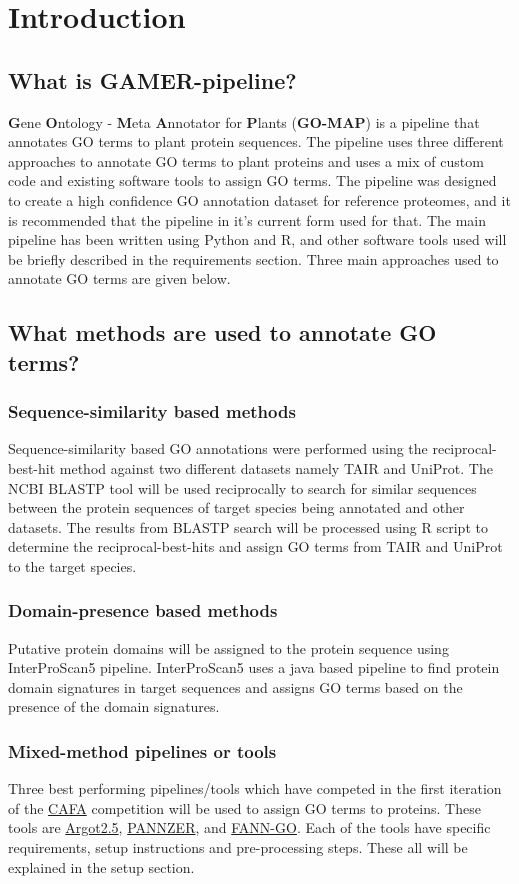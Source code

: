 \section{Introduction}

\subsection{What is GAMER-pipeline?}
\textbf{G}ene \textbf{O}ntology - \textbf{M}eta \textbf{A}nnotator for \textbf{P}lants (\textbf{GO-MAP}) is a pipeline that annotates GO terms to plant protein sequences. The pipeline uses three different approaches to annotate GO terms to plant proteins and uses a mix of custom code and existing software tools to assign GO terms. The pipeline was designed to create a high confidence GO annotation dataset for reference proteomes, and it is recommended that the pipeline in it's current form used for that. The main pipeline has been written using Python and R, and other software tools used will be briefly described in the requirements section. Three main approaches used to annotate GO terms are given below.

\subsection{What methods are used to annotate GO terms?}
\subsubsection{Sequence-similarity based methods}
Sequence-similarity based GO annotations were performed using the reciprocal-best-hit method against two different datasets namely TAIR and UniProt. The NCBI BLASTP tool will be used reciprocally to search for similar sequences between the protein sequences of target species being annotated and other datasets. The results from BLASTP search will be processed using R script to determine the reciprocal-best-hits and assign GO terms from TAIR and UniProt to the target species.

\subsubsection{Domain-presence based methods}
Putative protein domains will be assigned to the protein sequence using InterProScan5 pipeline. InterProScan5 uses a java based pipeline to find protein domain signatures in target sequences and assigns GO terms based on the presence of the domain signatures.

\subsubsection{Mixed-method pipelines or tools}
Three best performing pipelines/tools which have competed in the first iteration of the \href{http://biofunctionprediction.org}{CAFA} competition will be used to assign GO terms to proteins. These tools are \href{http://www.medcomp.medicina.unipd.it/Argot2-5/}{Argot2.5}, \href{http://ekhidna.biocenter.helsinki.fi/pannzer}{PANNZER}, and \href{http://montana.informatics.indiana.edu/fanngo/fanngo.html}{FANN-GO}. Each of the tools have specific requirements, setup instructions and pre-processing steps. These all will be explained in the setup section.